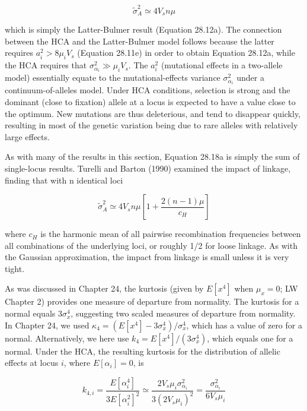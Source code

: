 \documentclass{article}
\begin{document}
\begin{equation}
\widetilde{\sigma}_{A}^{2}\simeq4V_{s}n\mu
\tag{28.18a}
\label{eq:28_18a}
\end{equation}

which is simply the Latter-Bulmer result (Equation 28.12a). The connection between the HCA and the Latter-Bulmer model follows because the latter requires  $ a_i^2 > 8\mu_i V_s $ (Equation 28.11e) in order to obtain Equation 28.12a, while the HCA requires that  $ \sigma_{\alpha_i}^2 \gg \mu_i V_s $. The  $ a_i^2 $ (mutational effects in a two-allele model) essentially equate to the mutational-effects variance  $ \sigma_{\alpha_i}^2 $ under a continuum-of-alleles model. Under HCA conditions, selection is strong and the dominant (close to fixation) allele at a locus is expected to have a value close to the optimum. New mutations are thus deleterious, and tend to disappear quickly, resulting in most of the genetic variation being due to rare alleles with relatively large effects.

As with many of the results in this section, Equation 28.18a is simply the sum of single-locus results. Turelli and Barton (1990) examined the impact of linkage, finding that with n identical loci

\begin{equation}
\widetilde{\sigma}_{A}^{2}\simeq4V_{s}n\mu\left[1+\frac{2(n-1)\mu}{c_{H}}\right]
\tag{28.18b}
\label{eq:28_18b}
\end{equation}

where  $ c_{H} $ is the harmonic mean of all pairwise recombination frequencies between all combinations of the underlying loci, or roughly 1/2 for loose linkage. As with the Gaussian approximation, the impact from linkage is small unless it is very tight.

As was discussed in Chapter 24, the kurtosis (given by  $ E[x^4] $ when  $ \mu_x = 0 $; LW Chapter 2) provides one measure of departure from normality. The kurtosis for a normal equals  $ 3\sigma_x^4 $, suggesting two scaled measures of departure from normality. In Chapter 24, we used  $ \kappa_4 = (E[x^4] - 3\sigma_x^4)/\sigma_x^4 $, which has a value of zero for a normal. Alternatively, we here use  $ k_4 = E[x^4]/(3\sigma_x^4) $, which equals one for a normal. Under the HCA, the resulting kurtosis for the distribution of allelic effects at locus  $ i $, where  $ E[\alpha_i] = 0 $, is

\begin{equation}
k_{4,i}=\frac{E[\alpha_{i}^{4}]}{3E[\alpha_{i}^{2}]^{2}}\simeq\frac{2V_{s}\mu_{i}\sigma_{\alpha_{i}}^{2}}{3(2V_{s}\mu_{i})^{2}}=\frac{\sigma_{\alpha_{i}}^{2}}{6V_{s}\mu_{i}}
\tag{28.18c}
\label{eq:28_18c}
\end{equation}
\end{document}
